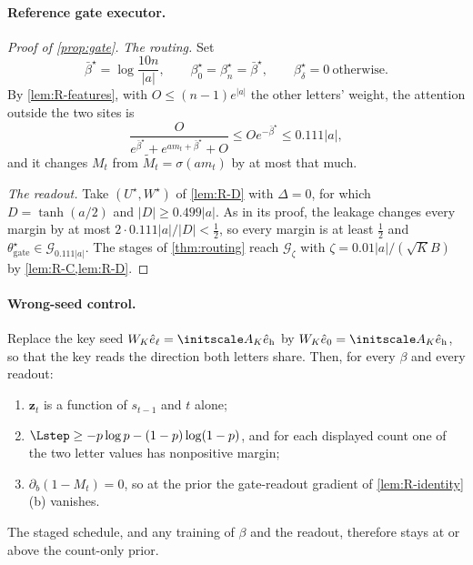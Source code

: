 \paragraph{Reference gate executor.}
\begin{proof}[Proof of \cref{prop:gate}]
\emph{The routing.} Set
\[
 \bar\beta^\star=\log\frac{10n}{|a|},\qquad \beta^\star_0=\beta^\star_n=\bar\beta^\star,\qquad \beta^\star_\delta=0\ \text{otherwise}.
\]
By \cref{lem:R-features}, with $O\le(n-1)e^{|a|}$ the other letters' weight, the attention outside the two sites is
\[
 \frac{O}{e^{\bar\beta^\star}+e^{am_t+\bar\beta^\star}+O}\le Oe^{-\bar\beta^\star}\le0.111|a|,
\]
and it changes $M_t$ from $\widetilde M_t=\sigma(am_t)$ by at most that much.

\emph{The readout.} Take $(U^\star,W^\star)$ of \cref{lem:R-D} with $\Delta=0$, for which $D=\tanh(a/2)$ and $|D|\ge0.499|a|$. As in its
proof, the leakage changes every margin by at most $2\cdot0.111|a|/|D|<\tfrac12$, so every margin is at least $\tfrac12$ and
$\theta^\star_{\mathrm{gate}}\in\mathcal G_{0.111|a|}$. The stages of \cref{thm:routing} reach $\mathcal G_\zeta$ with $\zeta=0.01|a|/(\sqrt KB)$ by
\cref{lem:R-C,lem:R-D}.
\end{proof}

\paragraph{Wrong-seed control.}
\begin{lemma}
\label{lem:wrong-seed}
Replace the key seed $W_K\hat e_\ell=\initscale A_K\hat e_{\mathrm h}$ by $W_K\hat e_{0}=\initscale A_K\hat e_{\mathrm h}$, so that the key reads the direction
both letters share. Then, for every $\beta$ and every readout:
\begin{enumerate}[label=(\roman*),leftmargin=*,itemsep=2pt,topsep=2pt]
\item $\bm z_t$ is a function of $s_{t-1}$ and $t$ alone;
\item $\Lstep\ge-p\log p-(1-p)\log(1-p)$, and for each displayed count one of the two letter values has nonpositive margin;
\item $\partial_b(1-M_t)=0$, so at the prior the gate-readout gradient of \cref{lem:R-identity}(b) vanishes.
\end{enumerate}
The staged schedule, and any training of $\beta$ and the readout, therefore stays at or above the count-only prior.
\end{lemma}

